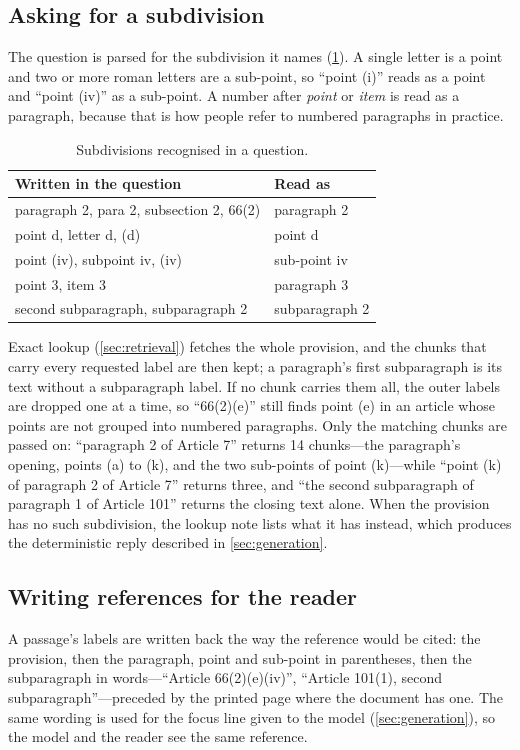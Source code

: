 \subsection{Asking for a subdivision}

The question is parsed for the subdivision it names (\cref{tab:subdivisions}).
A single letter is a point and two or more roman letters are a sub-point, so
``point (i)'' reads as a point and ``point (iv)'' as a sub-point. A number
after \emph{point} or \emph{item} is read as a paragraph, because that is how
people refer to numbered paragraphs in practice.

\begin{table}[ht]
\centering
\small
\begin{tabular}{@{}ll@{}}
\toprule
Written in the question & Read as \\
\midrule
paragraph 2, para 2, subsection 2, 66(2)  & paragraph 2 \\
point d, letter d, (d)                    & point d \\
point (iv), subpoint iv, (iv)             & sub-point iv \\
point 3, item 3                           & paragraph 3 \\
second subparagraph, subparagraph 2       & subparagraph 2 \\
\bottomrule
\end{tabular}
\caption{Subdivisions recognised in a question.}
\label{tab:subdivisions}
\end{table}

Exact lookup (\cref{sec:retrieval}) fetches the whole provision, and the
chunks that carry every requested label are then kept; a paragraph's first
subparagraph is its text without a subparagraph label. If no chunk carries
them all, the outer labels are dropped one at a time, so ``66(2)(e)'' still
finds point (e) in an article whose points are not grouped into numbered
paragraphs. Only the matching chunks are passed on: ``paragraph 2 of Article
7'' returns 14 chunks---the paragraph's opening, points (a) to (k), and the two
sub-points of point (k)---while ``point (k) of paragraph 2 of Article 7''
returns three, and ``the second subparagraph of paragraph 1 of Article 101''
returns the closing text alone. When the provision has no such subdivision, the
lookup note lists what it has instead, which produces the deterministic reply
described in \cref{sec:generation}.

\subsection{Writing references for the reader}

A passage's labels are written back the way the reference would be cited:
the provision, then the paragraph, point and sub-point in parentheses, then the
subparagraph in words---``Article 66(2)(e)(iv)'', ``Article 101(1), second
subparagraph''---preceded by the printed page where the document has one. The
same wording is used for the focus line given to the model
(\cref{sec:generation}), so the model and the reader see the same reference.
